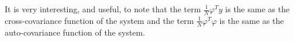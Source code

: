 It is very interesting, and useful, to note that the term $\frac{1}{N}\varphi^Ty$ is the same as the cross-covariance function of the system and the term $\frac{1}{N}\varphi^T\varphi$ is the same as the auto-covariance function of the system.


% 

